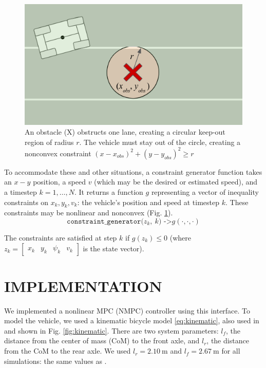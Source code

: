 \documentclass[letterpaper, 10 pt, conference]{ieeeconf}  %
\begin{document}
\begin{figure}[h]
	\centering
	\includegraphics[width=0.9\linewidth]{figures/obstacle_in_road.png}
	\caption{An obstacle (X) obstructs one lane, creating a circular keep-out region of radius $r$. The vehicle must stay out of the circle, creating a nonconvex constraint $(x-x_{obs})^2 + (y-y_{obs})^2 \geq r$}
	\label{fig:obstacle}
\end{figure}


To accommodate these and other situations, a constraint generator function takes an $x-y$ position, a speed $v$ (which may be the desired or estimated speed), and a timestep $k=1,\dots,N$. It returns a function $g$ representing a vector of inequality constraints on $x_k, y_k, v_k$: the vehicle's position and speed at timestep $k$. These constraints may be nonlinear and nonconvex (Fig. \ref{fig:obstacle}).
%
$$\texttt{constraint\_generator($z_k,\ k$) ->} g(\cdot, \cdot, \cdot)$$

The constraints are satisfied at step $k$ if $g(z_k) \leq 0$ (where $z_k = \begin{bmatrix}
x_k& y_k& \psi_k& v_k
\end{bmatrix}$ is the state vector).



 \section{IMPLEMENTATION}
 
We implemented a nonlinear MPC (NMPC) controller using this interface. To model the vehicle, we used a kinematic bicycle model \eqref{eq:kinematic}, also used in \cite{farag} and shown in Fig. \ref{fig:kinematic}. There are two system parameters: $l_f$, the distance from the center of mass (CoM) to the front axle, and $l_r$, the distance from the CoM to the rear axle. We used $l_r = 2.10\ \text{m}$ and $l_f = 2.67\ \text{m}$ for all simulations: the same values as \cite{farag}.
 
\end{document}
